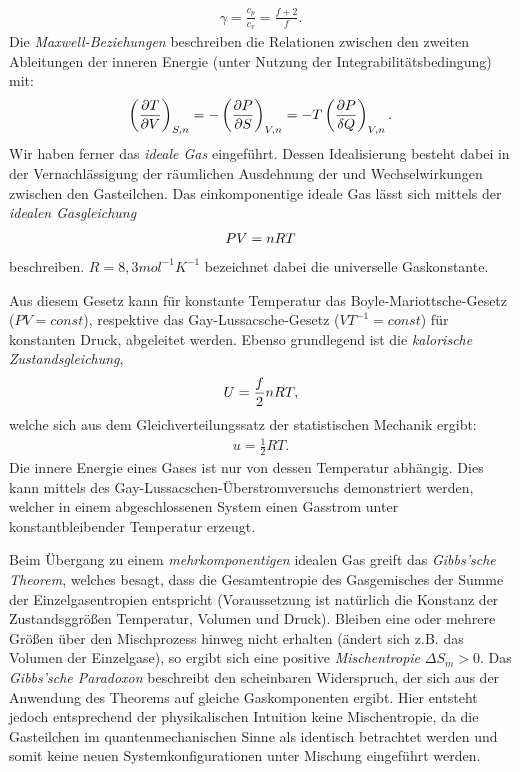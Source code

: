 \begin{summary}
    \begin{align*}
        \gamma=\frac{c_p}{c_v}=\frac{f+2}{f}.
    \end{align*}
    Die \emph{Maxwell-Beziehungen} beschreiben die Relationen zwischen den zweiten Ableitungen der inneren Energie (unter Nutzung der Integrabilitätsbedingung) mit:
    \begin{align*}
    \left(\frac{\partial T}{\partial V}\right)_{S,n }=-\left(\frac{\partial P}{\partial S}\right)_{V,n }=-T\left(\frac{\partial P}{\mathop{}\!\delta Q}\right)_{V,n }.
    \end{align*}
    Wir haben ferner das \emph{ideale Gas} eingeführt. Dessen Idealisierung besteht dabei in der Vernachlässigung der räumlichen Ausdehnung der \textendash{} und Wechselwirkungen zwischen den \textendash{} Gasteilchen.
    Das einkomponentige ideale Gas lässt sich mittels der \emph{idealen Gasgleichung} 
    \begin{align*}
        PV=n RT
    \end{align*}
    beschreiben. $R=8,3 mol^{-1}K^{-1}$ bezeichnet dabei die universelle Gaskonstante.

    Aus diesem Gesetz kann für konstante Temperatur das Boyle-Mariottsche-Gesetz ($PV=const$), respektive das Gay-Lussacsche-Gesetz ($VT^{-1}=const$) für konstanten Druck, abgeleitet werden.
    Ebenso grundlegend ist die \emph{kalorische Zustandsgleichung},
    \begin{align*}
        U=\frac{f}{2}n RT,
    \end{align*}
    welche sich aus dem Gleichverteilungssatz der statistischen Mechanik ergibt:
    \begin{align*}
        u=\frac{1}{2}RT.
    \end{align*}
    Die innere Energie eines Gases ist nur von dessen Temperatur abhängig. Dies kann mittels des Gay-Lussacschen-Überstromversuchs demonstriert werden, welcher in einem abgeschlossenen System einen Gasstrom unter konstantbleibender Temperatur erzeugt.
    
    Beim Übergang zu einem \emph{mehrkomponentigen} idealen Gas greift das \emph{Gibbs'sche Theorem}, welches besagt, dass die Gesamtentropie des Gasgemisches der Summe der Einzelgasentropien entspricht (Voraussetzung ist natürlich die Konstanz der Zustandsggrößen Temperatur, Volumen und Druck). Bleiben eine oder mehrere Größen über den Mischprozess hinweg nicht erhalten (ändert sich z.B. das Volumen der Einzelgase), so ergibt sich eine positive \emph{Mischentropie} $\Delta S_m>0$. Das \emph{Gibbs'sche Paradoxon} beschreibt den scheinbaren Widerspruch, der sich aus der Anwendung des Theorems auf gleiche Gaskomponenten ergibt. Hier entsteht jedoch \textendash{} entsprechend der physikalischen Intuition \textendash{} keine Mischentropie, da die Gasteilchen im quantenmechanischen Sinne als identisch betrachtet werden und somit keine neuen Systemkonfigurationen unter Mischung eingeführt werden.
    

\end{summary}
